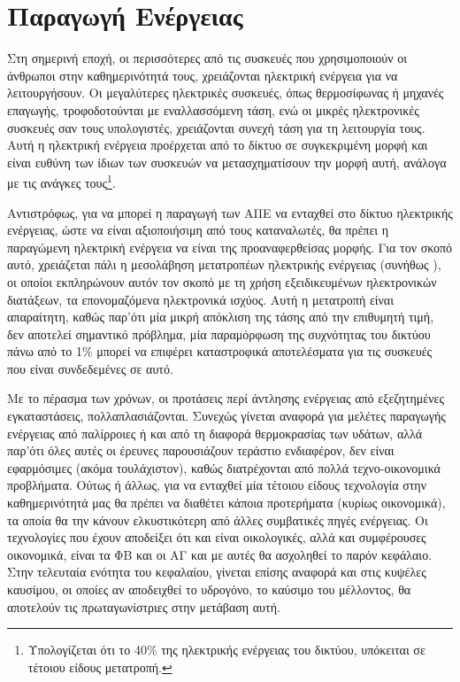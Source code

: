 \documentclass[12pt]{report}
\begin{document}
\chapter{Παραγωγή Ενέργειας}
Στη σημερινή εποχή, οι περισσότερες από τις συσκευές που χρησιμοποιούν οι άνθρωποι στην καθημερινότητά τους, χρειάζονται ηλεκτρική ενέργεια για να λειτουργήσουν. Οι μεγαλύτερες ηλεκτρικές συσκευές, όπως θερμοσίφωνας ή μηχανές
επαγωγής, τροφοδοτούνται με εναλλασσόμενη τάση, ενώ οι μικρές ηλεκτρονικές συσκευές σαν τους υπολογιστές, χρειάζονται συνεχή τάση για τη λειτουργία τους. Αυτή η ηλεκτρική ενέργεια προέρχεται από το δίκτυο σε συγκεκριμένη μορφή
{} και είναι ευθύνη των ίδιων των συσκευών να μετασχηματίσουν την μορφή αυτή, ανάλογα με τις ανάγκες τους\footnote{Υπολογίζεται ότι το 40\% της ηλεκτρικής ενέργειας του δικτύου, υπόκειται σε τέτοιου είδους
μετατροπή.}.

Αντιστρόφως, για να μπορεί η παραγωγή των ΑΠΕ να ενταχθεί στο δίκτυο ηλεκτρικής ενέργειας, ώστε να είναι αξιοποιήσιμη από τους καταναλωτές, θα πρέπει η παραγώμενη ηλεκτρική ενέργεια να είναι της προαναφερθείσας μορφής. Για τον σκοπό 
αυτό, χρειάζεται πάλι η μεσολάβηση μετατροπέων ηλεκτρικής ενέργειας (συνήθως {}), οι οποίοι εκπληρώνουν αυτόν τον σκοπό με τη χρήση εξειδικευμένων ηλεκτρονικών διατάξεων, τα επονομαζόμενα ηλεκτρονικά ισχύος. Αυτή 
η μετατροπή είναι απαραίτητη, καθώς παρ'ότι μία μικρή απόκλιση της τάσης από την επιθυμητή τιμή, δεν αποτελεί σημαντικό πρόβλημα, μία παραμόρφωση της συχνότητας του δικτύου πάνω από το 1\% μπορεί να επιφέρει καταστροφικά αποτελέσματα
για τις συσκευές που είναι συνδεδεμένες σε αυτό. 

Με το πέρασμα των χρόνων, οι προτάσεις περί άντλησης ενέργειας από εξεζητημένες εγκαταστάσεις, πολλαπλασιάζονται. Συνεχώς γίνεται αναφορά για μελέτες παραγωγής ενέργειας από παλίρροιες ή και από τη διαφορά θερμοκρασίας των υδάτων, 
αλλά παρ'ότι όλες αυτές οι έρευνες παρουσιάζουν τεράστιο ενδιαφέρον, δεν είναι εφαρμόσιμες (ακόμα τουλάχιστον), καθώς διατρέχονται από πολλά τεχνο-οικονομικά προβλήματα. Ούτως ή άλλως, για να ενταχθεί μία τέτοιου είδους τεχνολογία 
στην καθημερινότητά μας θα πρέπει να διαθέτει κάποια προτερήματα (κυρίως οικονομικά), τα οποία θα την κάνουν ελκυστικότερη από άλλες συμβατικές πηγές ενέργειας. Οι τεχνολογίες που έχουν αποδείξει ότι και είναι οικολογικές, αλλά και 
συμφέρουσες οικονομικά, είναι τα ΦΒ και οι ΑΓ και με αυτές θα ασχοληθεί το παρόν κεφάλαιο. Στην τελευταία ενότητα του κεφαλαίου, γίνεται επίσης αναφορά και στις κυψέλες καυσίμου, οι οποίες αν αποδειχθεί το υδρογόνο, το καύσιμο του 
μέλλοντος, θα αποτελούν τις πρωταγωνίστριες στην μετάβαση αυτή.
\end{document}
